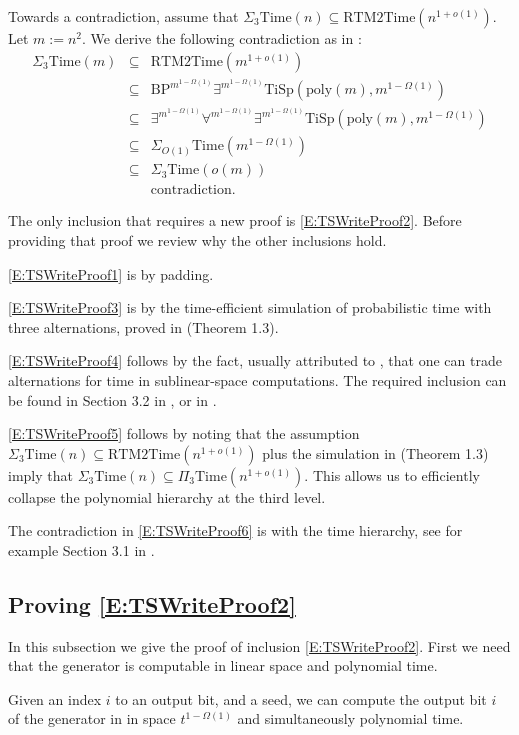 \documentclass{toc}
\newcommand{\poly}{\mathrm{poly}}
\newcommand{\Timex}[1]{\ensuremath{\mathrm{Time} \left( #1 \right)}}
\newcommand{\TiSp}[2]{\ensuremath{\mathrm{TiSp} \left(#1,#2 \right)}}
\newcommand{\BP}[1]{\ensuremath{\mathrm{BP}^{#1}}}
\newcommand{\RTMTime}[1]{\ensuremath{\mathrm{RTM2Time} \left( #1 \right)}}
\begin{document}
Towards a contradiction, assume that $\Sigma_{3}\Timex{n}\subseteq\RTMTime{n^{1+o(1)}}$.
Let $m:=n^{2}$. We derive the following contradiction as in \cite{ViolaBPvsE}:
\begin{eqnarray}
\Sigma_{3}\Timex{m} & \subseteq & \RTMTime{m^{1+o(1)}}\label{E:TSWriteProof1}\\
 & \subseteq & \BP{m^{1-\Omega(1)}}\exists^{m^{1-\Omega(1)}}\TiSp{\poly(m)}{m^{1-\Omega(1)}}\label{E:TSWriteProof2}\\
 & \subseteq & \exists^{m^{1-\Omega(1)}}\forall^{m^{1-\Omega(1)}}\exists^{m^{1-\Omega(1)}}\TiSp{\poly(m)}{m^{1-\Omega(1)}}\label{E:TSWriteProof3}\\
 & \subseteq & \Sigma_{O(1)}\Timex{m^{1-\Omega(1)}}\label{E:TSWriteProof4}\\
 & \subseteq & \Sigma_{3}\Timex{o(m)}\label{E:TSWriteProof5}\\
 &  & \mathrm{contradiction.}\label{E:TSWriteProof6}
\end{eqnarray}

The only inclusion that requires a new proof is \eqref{E:TSWriteProof2}.
Before providing that proof we review why the other inclusions hold.

\eqref{E:TSWriteProof1} is by padding.

\eqref{E:TSWriteProof3} is by the time-efficient simulation of probabilistic
time with three alternations, proved in \cite{ViolaBPvsE} (Theorem
1.3).

\eqref{E:TSWriteProof4} follows by the fact, usually attributed to
\cite{Nep70}, that one can trade alternations for time in sublinear-space
computations. The required inclusion can be found in Section 3.2 in
\cite{vMe04}, or in \cite{FLvMV05}.

\eqref{E:TSWriteProof5} follows by noting that the assumption $\Sigma_{3}\Timex{n}\subseteq\RTMTime{n^{1+o(1)}}$
plus the simulation in \cite{ViolaBPvsE} (Theorem 1.3) imply that
$\Sigma_{3}\Timex{n}\subseteq\Pi_{3}\Timex{n^{1+o(1)}}$. This allows
us to efficiently collapse the polynomial hierarchy at the third level.

The contradiction in \eqref{E:TSWriteProof6} is with the time hierarchy,
see for example Section 3.1 in \cite{vMe04}.

\subsection{Proving \eqref{E:TSWriteProof2}}

In this subsection we give the proof of inclusion \eqref{E:TSWriteProof2}.
First we need that the generator is computable in linear space and
polynomial time.
\begin{claim}
\label{claim:G-small-space} Given an index $i$ to an output bit,
and a seed, we can compute the output bit $i$ of the generator in
 in space $t^{1-\Omega(1)}$ and simultaneously
polynomial time.
\end{claim}
\end{document}
